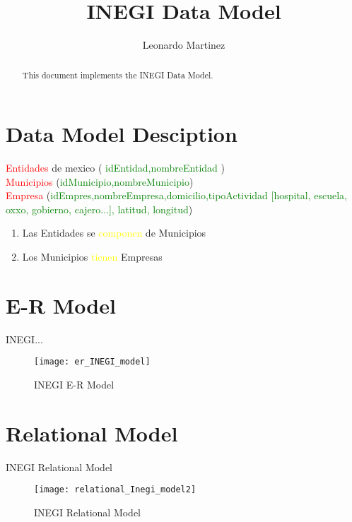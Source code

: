 \documentclass[10pt]{article}         %
\title{INEGI Data Model}
\author{Leonardo Martinez}
\begin{document}
\maketitle

\begin{abstract}
This document implements the INEGI Data Model.
\end{abstract}

\section{Data Model Desciption}


\textcolor{red}{Entidades} de mexico ( \textcolor{green}{idEntidad,nombreEntidad} )\\
\textcolor{red}{Municipios} (\textcolor{green}{idMunicipio,nombreMunicipio})\\
\textcolor{red}{Empresa} (\textcolor{green}{idEmpres,nombreEmpresa,domicilio,tipoActividad [hospital, escuela, oxxo, gobierno, cajero...], latitud, longitud})\\

\begin{enumerate}
\item
Las Entidades se \textcolor{yellow}{componen} de Municipios \\
\item
Los Municipios \textcolor{yellow}{tienen} Empresas\\
\end{enumerate}


\section{E-R Model}

INEGI...

\begin{figure}[h]
     \texttt{[image: er\_INEGI\_model]}
     \caption{INEGI E-R Model}
\end{figure}
   
\section{Relational Model}
INEGI Relational Model

\begin{figure}[h]
     \texttt{[image: relational\_Inegi\_model2]}
     \caption{INEGI Relational Model}
\end{figure}
\end{document}

